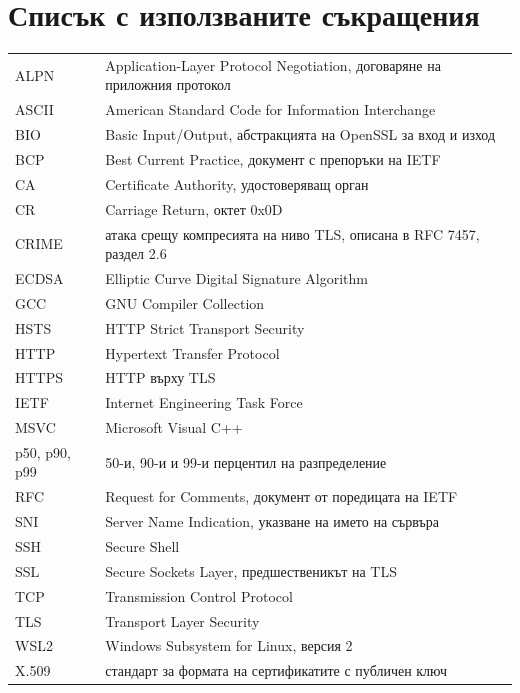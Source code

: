 \section*{Списък с използваните съкращения}
\label{sec:abbrev}

\begin{longtable}{@{}L{3cm}L{13cm}@{}}
ALPN & Application-Layer Protocol Negotiation, договаряне на приложния протокол \\
ASCII & American Standard Code for Information Interchange \\
BIO & Basic Input/Output, абстракцията на OpenSSL за вход и изход \\
BCP & Best Current Practice, документ с препоръки на IETF \\
CA & Certificate Authority, удостоверяващ орган \\
CR & Carriage Return, октет 0x0D \\
CRIME & атака срещу компресията на ниво TLS, описана в RFC 7457, раздел 2.6 \\
ECDSA & Elliptic Curve Digital Signature Algorithm \\
GCC & GNU Compiler Collection \\
HSTS & HTTP Strict Transport Security \\
HTTP & Hypertext Transfer Protocol \\
HTTPS & HTTP върху TLS \\
IETF & Internet Engineering Task Force \\
MSVC & Microsoft Visual C++ \\
p50, p90, p99 & 50-и, 90-и и 99-и перцентил на разпределение \\
RFC & Request for Comments, документ от поредицата на IETF \\
SNI & Server Name Indication, указване на името на сървъра \\
SSH & Secure Shell \\
SSL & Secure Sockets Layer, предшественикът на TLS \\
TCP & Transmission Control Protocol \\
TLS & Transport Layer Security \\
WSL2 & Windows Subsystem for Linux, версия 2 \\
X.509 & стандарт за формата на сертификатите с публичен ключ \\
\end{longtable}
